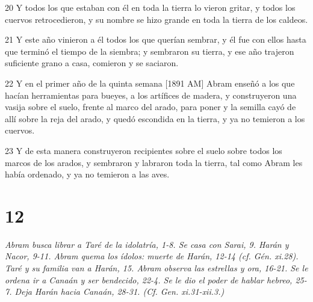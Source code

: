 \par 20 Y todos los que estaban con él en toda la tierra lo vieron gritar, y todos los cuervos retrocedieron, y su nombre se hizo grande en toda la tierra de los caldeos.
\par 21 Y este año vinieron a él todos los que querían sembrar, y él fue con ellos hasta que terminó el tiempo de la siembra; y sembraron su tierra, y ese año trajeron suficiente grano a casa, comieron y se saciaron.
\par 22 Y en el primer año de la quinta semana [1891 AM] Abram enseñó a los que hacían herramientas para bueyes, a los artífices de madera, y construyeron una vasija sobre el suelo, frente al marco del arado, para poner y la semilla cayó de allí sobre la reja del arado, y quedó escondida en la tierra, y ya no temieron a los cuervos.
\par 23 Y de esta manera construyeron recipientes sobre el suelo sobre todos los marcos de los arados, y sembraron y labraron toda la tierra, tal como Abram les había ordenado, y ya no temieron a las aves.

\chapter{12}

\par \textit{Abram busca librar a Taré de la idolatría, 1-8. Se casa con Sarai, 9. Harán y Nacor, 9-11. Abram quema los ídolos: muerte de Harán, 12-14 (cf. Gén. xi.28). Taré y su familia van a Harán, 15. Abram observa las estrellas y ora, 16-21. Se le ordena ir a Canaán y ser bendecido, 22-4. Se le dio el poder de hablar hebreo, 25-7. Deja Harán hacia Canaán, 28-31. (Cf. Gen. xi.31-xii.3.)}

